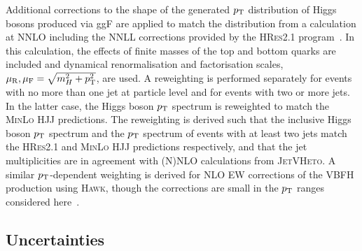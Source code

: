 Additional corrections to the shape of the generated $p_{\mathrm{T}}$ distribution of Higgs bosons produced via ggF are applied to match the distribution from a calculation at NNLO including the NNLL corrections provided by the \textsc{HRes2.1} program~\cite{HIGG-2013-32}. In this calculation, the effects of finite masses of the top and bottom quarks are included and dynamical renormalisation and factorisation scales, $\mu_\mathrm{R},\mu_\mathrm{F} = \sqrt{m_{H}^2 + p_{\mathrm{T}}^2}$, are used.  A reweighting is performed separately for events with no more than one jet at particle level and for events with two or more jets. In the latter case, the Higgs boson $p_{\mathrm{T}}$ spectrum is reweighted to match the \textsc{MinLo HJJ} predictions. The reweighting is derived such that the inclusive Higgs boson $p_{\mathrm{T}}$ spectrum and the $p_{\mathrm{T}}$ spectrum of events with at least two jets match the \textsc{HRes2.1} and \textsc{MinLo HJJ} predictions respectively, and that the jet multiplicities are in agreement with (N)NLO calculations from \textsc{JetVHeto}. A similar $p_{\mathrm{T}}$-dependent weighting is derived for NLO EW corrections of the VBFH production using \textsc{Hawk}, though the corrections are small in the $p_{\mathrm{T}}$ ranges considered here~\cite{HIGG-2013-32}.

\subsection{Uncertainties}

